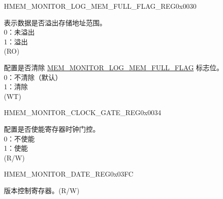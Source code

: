 \begin{register}{H}{MEM\_MONITOR\_LOG\_MEM\_FULL\_FLAG\_REG}{0x0030}\label{regdesc:MEMMONITORLOGMEMFULLFLAGREG}
%
%
%
\regnewline%
\begin{regdesc}\begin{reglist}
\label{fielddesc:MEMMONITORLOGMEMFULLFLAG}\item [MEM\_MONITOR\_LOG\_MEM\_FULL\_FLAG] 表示数据是否溢出存储地址范围。\\
0：未溢出\\
1：溢出\\
(RO)
\label{fielddesc:MEMMONITORCLRLOGMEMFULLFLAG}\item [MEM\_MONITOR\_CLR\_LOG\_MEM\_FULL\_FLAG] 配置是否清除 \hyperref[fielddesc:MEMMONITORLOGMEMFULLFLAG]{MEM\_MONITOR\_LOG\_MEM\_FULL\_FLAG} 标志位。\\
0：不清除（默认）\\
1：清除\\
(WT)
\end{reglist}\end{regdesc}
\end{register}


\begin{register}{H}{MEM\_MONITOR\_CLOCK\_GATE\_REG}{0x0034}\label{regdesc:MEMMONITORCLOCKGATEREG}
%
%
\regnewline%
\begin{regdesc}\begin{reglist}
\label{fielddesc:MEMMONITORCLKEN}\item [MEM\_MONITOR\_CLK\_EN] 配置是否使能寄存器时钟门控。\\
0：不使能\\
1：使能\\
(R/W)
\end{reglist}\end{regdesc}
\end{register}


\begin{register}{H}{MEM\_MONITOR\_DATE\_REG}{0x03FC}\label{regdesc:MEMMONITORDATEREG}
%
%
\regnewline%
\begin{regdesc}\begin{reglist}
\label{fielddesc:MEMMONITORDATE}\item [MEM\_MONITOR\_DATE] 版本控制寄存器。(R/W)
\end{reglist}\end{regdesc}
\end{register}
